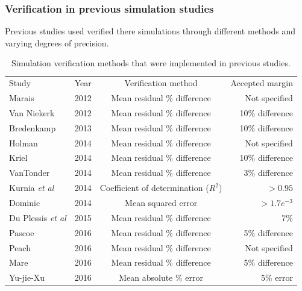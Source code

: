  	\subsubsection{Verification in previous simulation studies}
 	Previous studies used verified there simulations through different methods and varying degrees of precision. \\
 	\begin{table}[h]
 		\centering
 		\begin{tabular}{p{5cm}ccr}
 			\hline
 			Study & Year & Verification method & Accepted margin\\
 			\hhline{====}
 			Marais \cite{Marais2012PhD} 						& 2012 & Mean residual \% difference  & Not specified\\
 			Van Niekerk \cite{vanNiekerk2012Value} 				& 2012 &  Mean residual \% difference & 10\% difference \\
 			Bredenkamp \cite{Bredenkamp2013Masters} 			& 2013 & Mean residual \% difference & 10\% difference \\
 			Holman \cite{Holman2014Masters} 					& 2014 & Mean residual \% difference & Not specified  \\
 			Kriel \cite{Marais2012PhD} 							& 2014 &  Mean residual \% difference & 10\% difference \\
 			VanTonder \cite{vanTonder2014PhD}					& 2014 &  Mean residual \% difference & 3\% difference \\
 			Kurnia \textit{et al} \cite{kurnia2014simulation} 	& 2014 & Coefficient of determination ($R^2$) & $>0.95$ \\
 			Dominic \cite{dominic2014dynamic}					& 2014 & Mean squared error & $>1.7e^{-3}$	\\
 			Du Plessis \textit{et al}\cite{du2015development} 	& 2015 &  Mean residual \% difference & 7\%  \\
 			Pascoe \cite{Pascoe2016Masters} 					& 2016 &  Mean residual \% difference & 5\% difference \\	
			Peach \cite{Peach2016Masters}						& 2016 &  Mean residual \% difference & Not specified\\
 			Mare \cite{Mare2016PhD} 							& 2016 &  Mean residual \% difference & 5\% difference  \\	
 			Yu-jie-Xu \cite{xu2016modeling}						& 2016 & Mean absolute \% error & 5\%  error\\
 			\hline
 		\end{tabular} 
 		\caption{Simulation verification methods that were implemented in previous studies.}
 		\label{table: Verification studies}
 	\end{table}
\clearpage	
